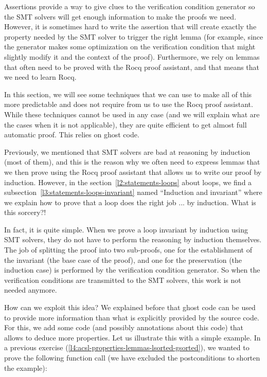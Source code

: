 Assertions provide a way to give clues to the verification condition generator
so the SMT solvers will get enough information to make the proofs we
need. However, it is sometimes hard to write the assertion that will
create exactly the property needed by the SMT solver to trigger the right lemma
(for example, since the generator makes some optimization on the verification
condition that might slightly modify it and the context of the proof).
Furthermore, we rely on lemmas that often need to be proved with the Rocq proof
assistant, and that means that we need to learn Rocq.



In this section, we will see some techniques that we can use to make all of this
more predictable and does not require from us to use the Rocq proof assistant.
While these techniques cannot be used in any case (and we will explain what are
the cases when it is not applicable), they are quite efficient to get almost
full automatic proof. This relies on ghost code.






Previously, we mentioned that SMT solvers are bad at reasoning by induction
(most of them), and this is the reason why we often need to express lemmas that
we then prove using the Rocq proof assistant that allows us to write our proof
by induction. However, in the section~\ref{l2:statements-loops} about loops, we
find a subsection~\ref{l3:statements-loops-invariant} named ``Induction and
invariant'' where we explain how to prove that a loop does the right job ... by
induction. What is this sorcery?!




In fact, it is quite simple. When we prove a loop invariant by induction using
SMT solvers, they do not have to perform the reasoning by induction themselves.
The job of splitting the proof into two sub-proofs, one for the establishment of
the invariant (the base case of the proof), and one for the preservation (the
induction case) is performed by the verification condition generator. So when
the verification conditions are transmitted to the SMT solvers, this work is not
needed anymore.




How can we exploit this idea? We explained before that ghost code can be used to
provide more information than what is explicitly provided by the source code.
For this, we add some code (and possibly annotations about this code) that
allows to deduce more properties. Let us illustrate this with a simple example.
In a previous exercise (\ref{l4:acsl-properties-lemmas-lsorted-gsorted}), we
wanted to prove the following function call (we have excluded the postconditions
to shorten the example):



